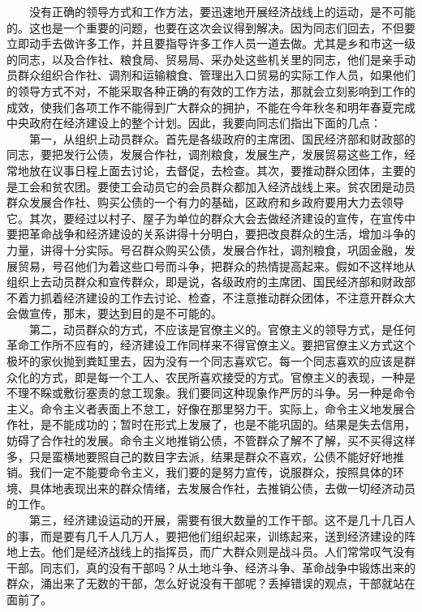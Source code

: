 \documentclass[cn,11pt,chinese]{elegantbook}
\begin{document}
　　没有正确的领导方式和工作方法，要迅速地开展经济战线上的运动，是不可能的。这也是一个重要的问题，也要在这次会议得到解决。因为同志们回去，不但要立即动手去做许多工作，并且要指导许多工作人员一道去做。尤其是乡和市这一级的同志，以及合作社、粮食局、贸易局、采办处这些机关里的同志，他们是亲手动员群众组织合作社、调剂和运输粮食、管理出入口贸易的实际工作人员，如果他们的领导方式不对，不能采取各种正确的有效的工作方法，那就会立刻影响到工作的成效，使我们各项工作不能得到广大群众的拥护，不能在今年秋冬和明年春夏完成中央政府在经济建设上的整个计划。因此，我要向同志们指出下面的几点：\\
　　第一，从组织上动员群众。首先是各级政府的主席团、国民经济部和财政部的同志，要把发行公债，发展合作社，调剂粮食，发展生产，发展贸易这些工作，经常地放在议事日程上面去讨论，去督促，去检查。其次，要推动群众团体，主要的是工会和贫农团。要使工会动员它的会员群众都加入经济战线上来。贫农团是动员群众发展合作社、购买公债的一个有力的基础，区政府和乡政府要用大力去领导它。其次，要经过以村子、屋子为单位的群众大会去做经济建设的宣传，在宣传中要把革命战争和经济建设的关系讲得十分明白，要把改良群众的生活，增加斗争的力量，讲得十分实际。号召群众购买公债，发展合作社，调剂粮食，巩固金融，发展贸易，号召他们为着这些口号而斗争，把群众的热情提高起来。假如不这样地从组织上去动员群众和宣传群众，即是说，各级政府的主席团、国民经济部和财政部不着力抓着经济建设的工作去讨论、检查，不注意推动群众团体，不注意开群众大会做宣传，那末，要达到目的是不可能的。\\
　　第二，动员群众的方式，不应该是官僚主义的。官僚主义的领导方式，是任何革命工作所不应有的，经济建设工作同样来不得官僚主义。要把官僚主义方式这个极坏的家伙抛到粪缸里去，因为没有一个同志喜欢它。每一个同志喜欢的应该是群众化的方式，即是每一个工人、农民所喜欢接受的方式。官僚主义的表现，一种是不理不睬或敷衍塞责的怠工现象。我们要同这种现象作严厉的斗争。另一种是命令主义。命令主义者表面上不怠工，好像在那里努力干。实际上，命令主义地发展合作社，是不能成功的；暂时在形式上发展了，也是不能巩固的。结果是失去信用，妨碍了合作社的发展。命令主义地推销公债，不管群众了解不了解，买不买得这样多，只是蛮横地要照自己的数目字去派，结果是群众不喜欢，公债不能好好地推销。我们一定不能要命令主义，我们要的是努力宣传，说服群众，按照具体的环境、具体地表现出来的群众情绪，去发展合作社，去推销公债，去做一切经济动员的工作。\\
　　第三，经济建设运动的开展，需要有很大数量的工作干部。这不是几十几百人的事，而是要有几千人几万人，要把他们组织起来，训练起来，送到经济建设的阵地上去。他们是经济战线上的指挥员，而广大群众则是战斗员。人们常常叹气没有干部。同志们，真的没有干部吗？从土地斗争、经济斗争、革命战争中锻炼出来的群众，涌出来了无数的干部，怎么好说没有干部呢？丢掉错误的观点，干部就站在面前了。\\
\end{document}
